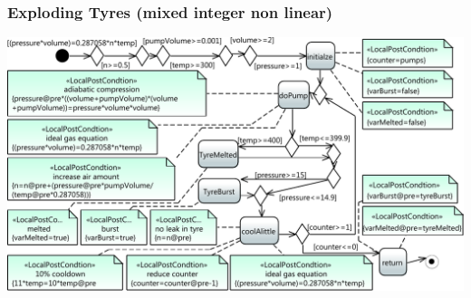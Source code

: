 \documentclass{beamer}
\begin{document}
\begin{frame}
\frametitle{Exploding Tyres (mixed integer non linear)}
% 
\includegraphics[width=\textwidth]{./pics/TyrePumpModel.pdf}
\end{frame}
\end{document}
